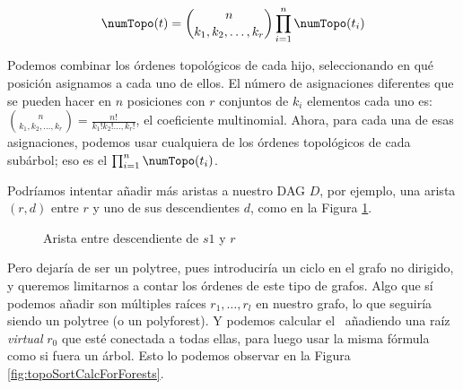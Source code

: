 $$\numTopo(t) =  \binom{n}{k_1, k_2, \ldots, k_r} \prod_{i=1}^{n} \numTopo(t_i)$$

Podemos combinar los órdenes topológicos de cada hijo, seleccionando en qué posición asignamos a cada uno de ellos. El número de asignaciones diferentes que se pueden hacer en $n$ posiciones con $r$ conjuntos de $k_i$ elementos cada uno es: $ \binom{n}{k_1, k_2, \ldots, k_r}= \frac{n!}{k_1! k_2! \ldots, k_r!}$, el coeficiente multinomial. Ahora, para cada una de esas asignaciones, podemos usar cualquiera de los órdenes topológicos de cada subárbol; eso es el $\prod_{i=1}^{n} \numTopo(t_i)$.

Podríamos intentar añadir más aristas a nuestro DAG $D$, por ejemplo, una arista $(r,d)$ entre $r$ y uno de sus descendientes $d$, como en la Figura \ref{fig:notPolytreeExample}.

\begin{figure}[ht]
\centering 
    \caption{Arista entre descendiente de $s1$ y $r$}
    \label{fig:notPolytreeExample}
\end{figure}

Pero dejaría de ser un polytree, pues introduciría un ciclo en el grafo no dirigido, y queremos limitarnos a contar los órdenes de este tipo de grafos. Algo que sí podemos añadir son múltiples raíces $r_1, \dots, r_l$ en nuestro grafo, lo que seguiría siendo un polytree (o un polyforest). Y podemos calcular el \numTopo \ añadiendo una raíz \emph{virtual} $r_0$ que esté conectada a todas ellas, para luego usar la misma fórmula como si fuera un árbol. Esto lo podemos observar en la Figura \ref{fig:topoSortCalcForForests}.

